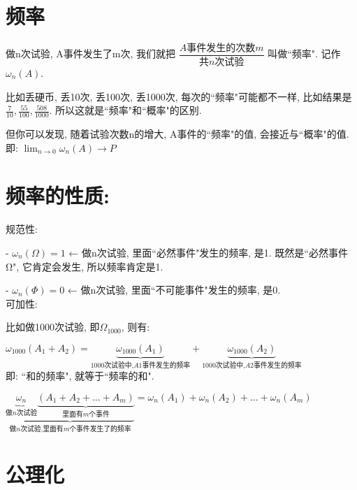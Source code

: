 \documentclass[UTF8]{ctexart}
\begin{document}
\section{频率}

做n次试验, A事件发生了m次, 我们就把 $\dfrac{A\text{事件发生的次数}m}{\text{共}n\text{次试验}}$ 叫做``频率". 记作$\omega _n\left( A \right) $.

比如丢硬币, 丢10次, 丢100次, 丢1000次, 每次的``频率"可能都不一样, 比如结果是 $\frac{7}{10},\frac{55}{100},\frac{508}{1000} $. 所以这就是``频率"和``概率"的区别.

但你可以发现, 随着试验次数n的增大, A事件的``频率"的值, 会接近与``概率"的值. 即: $ \lim_{n→0}\omega _n\left( A \right)  \to P $


\section{频率的性质:}

规范性: 

- $\omega _n\left( \varOmega \right) =1$ ← 做n次试验, 里面``必然事件"发生的频率, 是1.  
既然是``必然事件Ω", 它肯定会发生, 所以频率肯定是1.


- $\omega _n\left( \varPhi \right) =0$ ← 做n次试验, 里面``不可能事件"发生的频率, 是0. \\



可加性: 


比如做1000次试验, 即$ \varOmega_{1000}$, 则有: 

$\omega _{1000}\left( A_1+A_2 \right) =\underset{1000\text{次试验中,}A1\text{事件发生的频率}}{\underbrace{\omega _{1000}\left( A_1 \right) }}+\underset{1000\text{次试验中,}A2\text{事件发生的频率}}{\underbrace{\omega _{1000}\left( A_2 \right) }}$ \\

即: ``和的频率", 就等于``频率的和".

$
\boxed{
\underset{\text{做}n\text{次试验,里面有}m\text{个事件发生了的频率}}{\underbrace{\underset{\text{做}n\text{次试验}}{\underbrace{\omega _n}}\underset{\text{里面有}m\text{个事件}}{\underbrace{\left( A_1+A_2+...+A_m \right) }}}}=\omega _n\left( A_1 \right) +\omega _n\left( A_2 \right) +...+\omega _n\left( A_m \right) 
}
$



	
\section{公理化}
	
\end{document}
